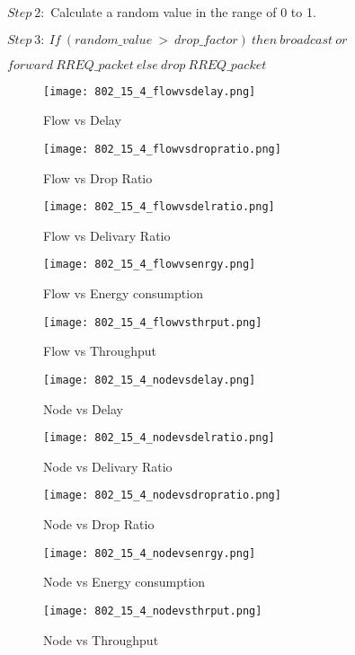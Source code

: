 \documentclass{report}
\begin{document}
$Step\ 2:$ Calculate a random value in the range of 0 to 1.

$Step\ 3:\ If\ (random\_value\ >\ drop\_factor)\ then\ broadcast\ or\ $

$forward\ RREQ\_packet\ else\ drop\ RREQ\_packet$

\begin{figure}
  \caption{Flow vs Delay}
  \centering
    \texttt{[image: 802\_15\_4\_flowvsdelay.png]}
\end{figure}
\begin{figure}
  \caption{Flow vs Drop Ratio}
  \centering
    \texttt{[image: 802\_15\_4\_flowvsdropratio.png]}
\end{figure}
\begin{figure}
  \caption{Flow vs Delivary Ratio}
  \centering
    \texttt{[image: 802\_15\_4\_flowvsdelratio.png]}
\end{figure}
\begin{figure}
  \caption{Flow vs Energy consumption}
  \centering
    \texttt{[image: 802\_15\_4\_flowvsenrgy.png]}
\end{figure}
\begin{figure}
  \caption{Flow vs Throughput}
  \centering
    \texttt{[image: 802\_15\_4\_flowvsthrput.png]}
\end{figure}


\begin{figure}
  \caption{Node vs Delay}
  \centering
    \texttt{[image: 802\_15\_4\_nodevsdelay.png]}
\end{figure}
\begin{figure}
  \caption{Node vs Delivary Ratio}
  \centering
    \texttt{[image: 802\_15\_4\_nodevsdelratio.png]}
\end{figure}
\begin{figure}
  \caption{Node vs Drop Ratio}
  \centering
    \texttt{[image: 802\_15\_4\_nodevsdropratio.png]}
\end{figure}
\begin{figure}
  \caption{Node vs Energy consumption}
  \centering
    \texttt{[image: 802\_15\_4\_nodevsenrgy.png]}
\end{figure}
\begin{figure}
  \caption{Node vs Throughput}
  \centering
    \texttt{[image: 802\_15\_4\_nodevsthrput.png]}
\end{figure}
\end{document}

